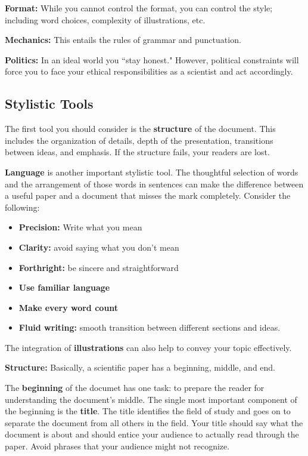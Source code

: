 \textbf{Format:} While you cannot control the format, you can control the style; including word choices, complexity of illustrations, etc.


\textbf{Mechanics:} This entails the rules of grammar and punctuation.


\textbf{Politics:} In an ideal world you ``stay honest." However, political constraints will force you to face your ethical responsibilities as a scientist and act accordingly.


\subsection{Stylistic Tools}

The first tool you should consider is the \textbf{structure} of the document. This includes the organization of details, depth of the presentation, transitions between ideas, and emphasis. If the structure fails, your readers are lost.


\textbf{Language} is another important stylistic tool. The thoughtful selection of words and the arrangement of those words in sentences can make the difference between a useful paper and a document that misses the mark completely. Consider the following:
\begin{itemize}
    \item \textbf{Precision:} Write what you mean
    \item \textbf{Clarity:} avoid saying what you don't mean
    \item \textbf{Forthright:} be sincere and straightforward
    \item \textbf{Use familiar language}
    \item \textbf{Make every word count}
    \item \textbf{Fluid writing:} smooth transition between different sections and ideas.
\end{itemize}

The integration of \textbf{illustrations} can also help to convey your topic effectively.


\textbf{Structure:} Basically, a scientific paper has a beginning, middle, and end.

The \textbf{beginning} of the documet has one task: to prepare the reader for understanding the document's middle. The single most important component of the beginning is the \textbf{title}. The title identifies the field of study and goes on to separate the document from all others in the field. Your title should say what the document is about and should entice your audience to actually read through the paper. Avoid phrases that your audience might not recognize.

